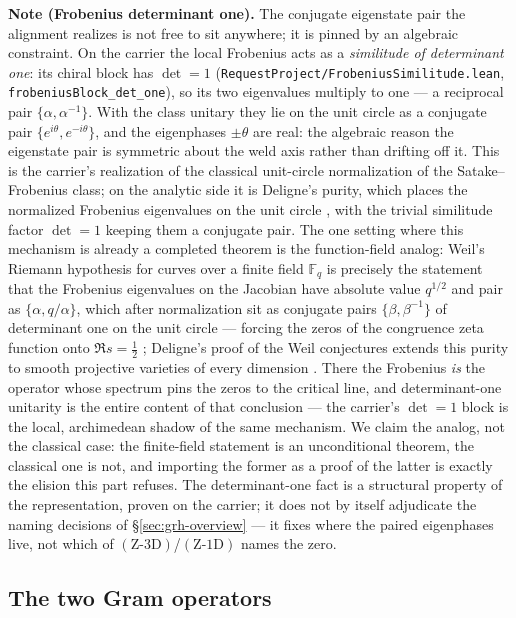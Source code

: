 \medskip
\noindent\textbf{Note (Frobenius determinant one).} The conjugate eigenstate pair the alignment
realizes is not free to sit anywhere; it is pinned by an algebraic constraint. On the carrier the
local Frobenius acts as a \emph{similitude of determinant one}: its chiral block has \(\det=1\)
(\texttt{RequestProject/FrobeniusSimilitude.lean}, \texttt{frobeniusBlock\_det\_one}), so its two
eigenvalues multiply to one --- a reciprocal pair \(\{\alpha,\alpha^{-1}\}\). With the class
unitary they lie on the unit circle as a conjugate pair \(\{e^{i\theta},e^{-i\theta}\}\), and the
eigenphases \(\pm\theta\) are real: the algebraic reason the eigenstate pair is symmetric about the
weld axis rather than drifting off it. This is the carrier's realization of the classical
unit-circle normalization of the Satake--Frobenius class; on the analytic side it is Deligne's
purity, which places the normalized Frobenius eigenvalues on the unit circle \cite{Deligne}, with
the trivial similitude factor \(\det=1\) keeping them a conjugate pair. The one setting where this
mechanism is already a completed theorem is the function-field analog: Weil's Riemann hypothesis for
curves over a finite field \(\mathbb F_q\) is precisely the statement that the Frobenius eigenvalues
on the Jacobian have absolute value \(q^{1/2}\) and pair as \(\{\alpha,q/\alpha\}\), which after
normalization sit as conjugate pairs \(\{\beta,\beta^{-1}\}\) of determinant one on the unit circle
--- forcing the zeros of the congruence zeta function onto \(\Re s=\tfrac12\) \cite{Weil}; Deligne's
proof of the Weil conjectures extends this purity to smooth projective varieties of every dimension
\cite{Deligne}. There the Frobenius \emph{is} the operator whose spectrum pins the zeros to the
critical line, and determinant-one unitarity is the entire content of that conclusion --- the
carrier's \(\det=1\) block is the local, archimedean shadow of the same mechanism. We claim the
analog, not the classical case: the finite-field statement is an unconditional theorem, the
classical one is not, and importing the former as a proof of the latter is exactly the elision this
part refuses. The determinant-one fact is
a structural property of the representation, proven on the carrier; it does not by itself adjudicate
the naming decisions of \S\ref{sec:grh-overview} --- it fixes where the paired eigenphases live, not
which of \((\text{Z-3D})\)/\((\text{Z-1D})\) names the zero.

\subsection{The two Gram operators}\label{sec:grh-operators}

